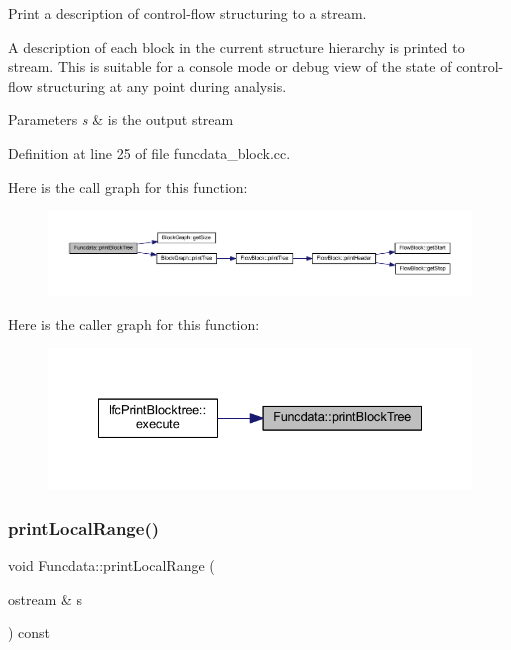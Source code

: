 Print a description of control-\/flow structuring to a stream. 

A description of each block in the current structure hierarchy is printed to stream. This is suitable for a console mode or debug view of the state of control-\/flow structuring at any point during analysis. 
\begin{DoxyParams}{Parameters}
{\em s} & is the output stream \\
\hline
\end{DoxyParams}


Definition at line 25 of file funcdata\+\_\+block.\+cc.

Here is the call graph for this function\+:
\nopagebreak
\begin{figure}[H]
\begin{center}
\leavevmode
\includegraphics[width=350pt]{class_funcdata_a8c86861b22f4beb1cac5ab3ab43db6ae_cgraph}
\end{center}
\end{figure}
Here is the caller graph for this function\+:
\nopagebreak
\begin{figure}[H]
\begin{center}
\leavevmode
\includegraphics[width=335pt]{class_funcdata_a8c86861b22f4beb1cac5ab3ab43db6ae_icgraph}
\end{center}
\end{figure}
\mbox{\label{class_funcdata_a2b52d8ec8b53529b02881977971067ce}} 
\subsubsection{\texorpdfstring{printLocalRange()}{printLocalRange()}}
{\footnotesize\ttfamily void Funcdata\+::print\+Local\+Range (\begin{DoxyParamCaption}\item[{ostream \&}]{s }\end{DoxyParamCaption}) const}



